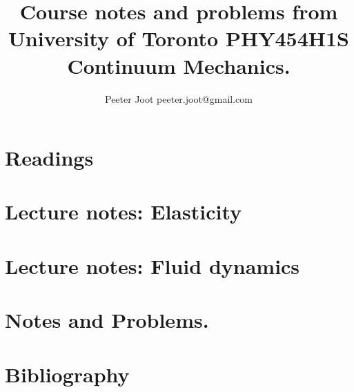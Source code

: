 \documentclass[12pt,leqno]{book}
\begin{document}

\title{Course notes and problems from\\University of Toronto PHY454H1S\\Continuum Mechanics.}
\author{Peeter Joot \quad peeter.joot@gmail.com}

\maketitle

\clearpage{}
\tableofcontents

\clearpage{}

\pagestyle{plain}



\part{Readings}


\part{Lecture notes: Elasticity}








\part{Lecture notes: Fluid dynamics}



\part{Notes and Problems.}


%
\part{Bibliography}




\end{document}
